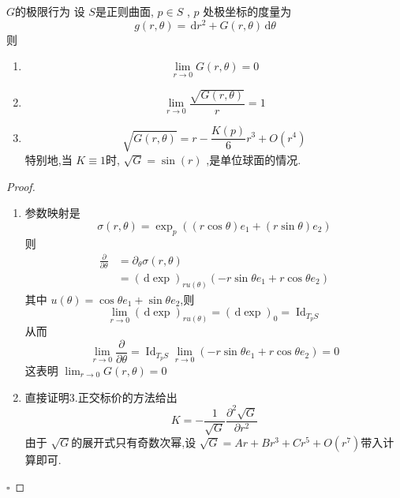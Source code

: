 \documentclass[../../main.tex]{subfiles}
\begin{document}
\begin{theorem}{\(  G  \)的极限行为  }
     设 \(  S  \)是正则曲面, \(  p \in S  \) ,  \(  p  \) 处极坐标的度量为 \[
   g\left( r, \theta  \right) = \,\mathrm{d} r^{2}+ G\left( r, \theta  \right)\,\mathrm{d}  \theta 
    \] 
    则
    \begin{enumerate}
        \item  \[
        \lim_{r\to 0}G\left( r, \theta  \right)= 0 
        \]
        \item \[
        \lim_{r\to 0} \frac{\sqrt{G\left( r, \theta  \right) } }{r }= 1 
        \]
        \item  \[
        \sqrt{G\left( r, \theta  \right) }= r-\frac{K\left( p \right)  }{6 }r^{3}+ O\left( r^{4} \right)  
        \]特别地,当 \(  K\equiv  1  \)时, \(  \sqrt{G}= \sin\left( r \right)    \) ,是单位球面的情况. 
    \end{enumerate}
    
\end{theorem}
\begin{proof}
    \begin{enumerate}
        \item 参数映射是 \[
     \sigma \left( r, \theta  \right) =  \exp _{p}\left( \left( r\cos  \theta  \right)  e_1+ \left( r\sin  \theta  \right)e_2 \right)  
    \] 则 \[
    \begin{aligned}
    \frac{\partial }{\partial  \theta }&=   \partial _{ \theta } \sigma \left( r, \theta  \right)  \\ 
     &= \left( \,\mathrm{d} \exp  \right)_{ ru\left(  \theta  \right)  }\left( -r\sin  \theta e_1+ r\cos  \theta e_2 \right)  
    \end{aligned}
    \]其中 \(  u\left(  \theta  \right)= \cos  \theta e_1+ \sin  \theta e_2   \),则 \[
    \lim_{r\to 0} \left( \,\mathrm{d} \exp  \right)_{r  u\left(  \theta  \right) }= \left( \,\mathrm{d} \exp  \right)_{0}= \operatorname{Id}_{T_{p}S}  
    \] 从而 \[
    \lim_{r\to 0} \frac{\partial }{\partial  \theta }= \operatorname{Id}_{T_{p}S} \lim_{r\to 0}\left( -r\sin  \theta e_1+ r\cos  \theta e_2 \right)= 0 
    \]这表明 \(  \lim_{r\to 0}G\left( r, \theta  \right)= 0   \) 
    \item 直接证明3.正交标价的方法给出 \[
    K= -\frac{1 }{\sqrt{G} }\frac{ \partial ^{2}\sqrt{G} }{ \partial r^{2} }  
    \]由于 \(  \sqrt{G}  \)的展开式只有奇数次幂,设 \(  \sqrt{G}= Ar+ Br^{3}+ Cr^{5}+ O\left( r^{7} \right)   \)带入计算即可.  
    \end{enumerate}
    

    \hfill $\square$
\end{proof}
\end{document}
